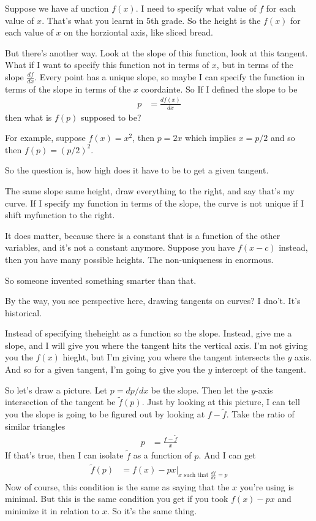 Suppose we have af unction $f(x)$.
I need to specify what value of $f$ for each value of $x$.
That's what you learnt in 5th grade.
So the height is the $f(x)$ for each value of $x$ on the horziontal axis,
like sliced bread.

But there's another way.
Look at the slope of this function,
look at this tangent.
What if I want to specify this function
not in terms of $x$,
but in terms of the slope $\frac{df}{dx}$.
Every point has a unique slope,
so maybe I can specify the function in terms of the slope in
terms of the $x$ coordainte.
So If I defined the slope to be
\begin{align}
    p &= \frac{df(x)}{dx}
\end{align}
then what is $f(p)$ supposed to be?

For example,
suppose $f(x)=x^2$,
then $p=2x$ which implies $x=p/2$ and so
then $f(p) = (p/2)^2$.

So the question is,
how high does it have to be to get a given tangent.

The same slope same height,
draw everything to the right,
and say that's my curve.
If I specify my function in terms of the slope,
the curve is not unique
if I shift myfunction to the right.

It does matter,
because there is a constant
that is a function of the other variables,
and it's not a constant anymore.
Suppose you have $f(x - c)$ instead,
then you have many possible heights.
The non-uniqueness in enormous.

So someone invented something smarter than that.

By the way,
you see perspective here,
drawing tangents on curves?
I dno't.
It's historical.

Instead of specifying theheight as a function so the slope.
Instead,
give me a slope,
and I will give you where the tangent hits the vertical axis.
I'm not giving you the $f(x)$ hieght,
but I'm giving you where the tangent intersects the $y$ axis.
And so for a given tangent,
I'm going to give you the $y$ intercept of the tangent.

So let's draw a picture.
Let $p=dp/dx$ be the slope.
Then let the $y$-axis intersection of the tangent be $\tilde{f}(p)$.
Just by looking at this picture,
I can tell you the slope is going to be figured out by looking at
$f - \tilde{f}$.
Take the ratio  of similar triangles
\begin{align}
    p &= \frac{f - \tilde{f}}{x}
\end{align}
If that's true,
then I can isolate $\tilde{f}$ as a function of $p$.
And I can get
\begin{align}
    \tilde{f}(p) &=
    \left .f(x) - px\right|_{x\text{ such that } \frac{df}{dx}=p}
\end{align}
Now of course,
this condition is the same as saying that the
$x$ you're using is minimal.
But this is the same condition you get if you took $f(x) - px$
and minimize it in relation to $x$.
So it's the same thing.

